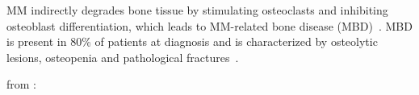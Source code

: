 MM indirectly degrades bone tissue by stimulating osteoclasts and inhibiting
osteoblast differentiation, which leads to MM-related bone disease
(MBD)~\cite{glaveyProteomicCharacterizationHuman2017}. MBD is present in 80\% of
patients at diagnosis and is characterized by osteolytic lesions, osteopenia and
pathological fractures~\cite{terposPathogenesisBoneDisease2018}.


from \cite{forsterMolecularImpactTumor2022}:






